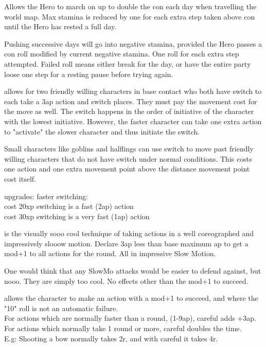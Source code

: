 

Allows the Hero to march on up to double the con each day when travelling the world map. Max stamina is reduced by one for each extra step taken above con until the Hero has rested a full day.

Pushing successive days will go into negative stamina, provided the Hero passes a con roll modified by current negative stamina. One roll for each extra step attempted. Failed roll means either break for the day, or have the entire party loose one step for a resting pause before trying again.


 allows for two friendly willing characters in base contact who both have switch to each take a 3ap action and switch places. They must pay the movement cost for the move as well. The switch happens in the order of initiative of the character with the lowest initiative. However, the faster character can take one extra action to "activate" the slower character and thus initiate the switch.

Small characters like goblins and halflings can use switch to move past friendly willing characters that do not have switch under normal conditions. This costs one action and one extra movement point above the distance movement point cost itself. 


upgrades: faster switching: \\
cost 20xp switching is a fast (2ap) action \\
cost 30xp switching is a very fast (1ap) action


 is the visually sooo cool technique of taking actions in a well coreographed and impressively slooow motion. Declare 3ap less than base maximum ap to get a mod+1 to all actions for the round. All in impressive Slow Motion.

One would think that any SlowMo attacks would be easier to defend against, but nooo. They are simply too cool. No effects other than the mod+1 to succeed.


 allows the character to make an action with a mod+1 to succeed, and where the "10" roll is not an automatic failure.\\
For actions which are normally faster than a round, (1-9ap), careful adds +3ap.\\
For actions which normally take 1 round or more, careful doubles the time.\\
E.g: Shooting a bow normally takes 2r, and with careful it takes 4r. 

